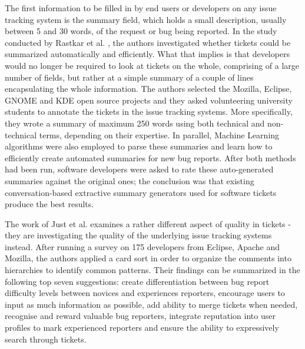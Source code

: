 \documentclass{mpaper}
\begin{document}
The first information to be filled in by end users or developers on any issue tracking system
is the summary field, which holds a small description, usually between 5 and 30 words, of 
the request or bug being reported. In the study conducted by Rastkar et al. \cite{rastkar2010summarizing}, 
the authors investigated whether tickets could be summarized automatically and efficiently. What 
that implies is that developers would no longer be required to look at tickets on the whole, comprising of 
a large number of fields, but rather at a simple summary of a couple of lines 
encapsulating the whole information. The authors selected the Mozilla, Eclipse, GNOME and KDE 
open source projects and they asked volunteering university students to annotate 
the tickets in the issue tracking systems. More specifically, they wrote a summary 
of maximum 250 words using both technical and non-technical terms, depending on their expertise. 
In parallel, Machine Learning algorithms were also employed to parse these summaries and 
learn how to efficiently create automated summaries for new bug reports. After both methods had been run, 
software developers were asked to rate these auto-generated summaries against the original ones; 
the conclusion was that existing conversation-based extractive summary generators used 
for software tickets produce the best results.

The work of Just et al. \cite{just2008towards} examines a rather different aspect
of quality in tickets - they are investigating the quality of the underlying issue 
tracking systems instead. 
After running a survey on 175 developers from Eclipse, Apache and Mozilla,
the authors applied a card sort in order to organize the comments into hierarchies to 
identify common patterns. Their findings can be summarized in the following top seven
suggestions: create differentiation between bug report difficulty levels between 
novices and experiences reporters, encourage users to input as much information as possible, 
add ability to merge tickets when needed, recognise and reward valuable bug reporters, integrate 
reputation into user profiles to mark experienced reporters and ensure the ability to expressively search through tickets.
\end{document}
